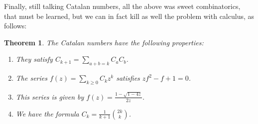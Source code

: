 \documentclass[12pt]{amsbook}
\newtheorem{theorem}{Theorem}[chapter]
\begin{document}
Finally, still talking Catalan numbers, all the above was sweet combinatorics, that must be learned, but we can in fact kill as well the problem with calculus, as follows: 


\begin{theorem}
The Catalan numbers have the following properties:
\begin{enumerate}
\item They satisfy $C_{k+1}=\sum_{a+b=k}C_aC_b$.

\item The series $f(z)=\sum_{k\geq0}C_kz^k$ satisfies $zf^2-f+1=0$.

\item This series is given by $f(z)=\frac{1-\sqrt{1-4z}}{2z}$.

\item We have the formula $C_k=\frac{1}{k+1}\binom{2k}{k}$.
\end{enumerate}
\end{theorem}
\end{document}
